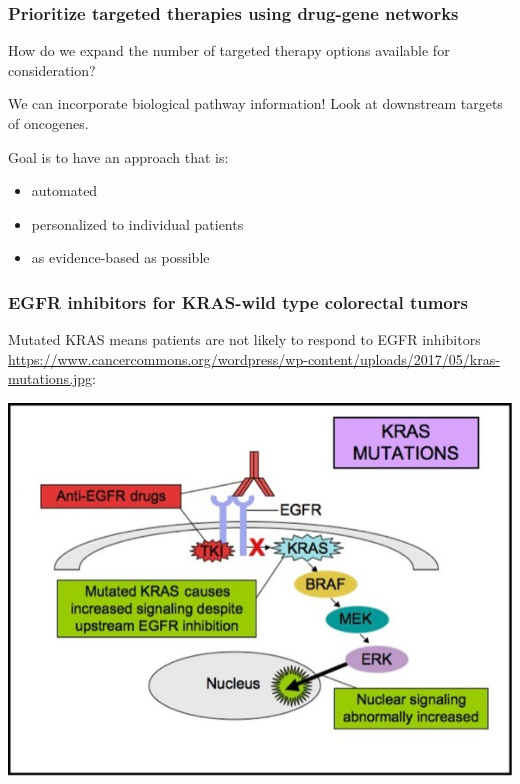 \documentclass{beamer}
\begin{document}

\begin{frame}
\frametitle{Prioritize targeted therapies using drug-gene networks}

How do we expand the number of targeted therapy options available for consideration? 

\vspace{0.5cm}

We can incorporate biological pathway information! {\color{red}Look at downstream targets of oncogenes}.

\vspace{0.5cm}

Goal is to have an approach that is:

\begin{itemize}
\item automated
\item personalized to individual patients
\item as evidence-based as possible
\end{itemize}

\end{frame}


\begin{frame}
\frametitle{EGFR inhibitors for KRAS-wild type colorectal tumors}

Mutated KRAS means patients are not likely to respond to EGFR inhibitors \url{https://www.cancercommons.org/wordpress/wp-content/uploads/2017/05/kras-mutations.jpg}:

\includegraphics[height=0.72\textheight, center]{mutated_KRAS_path.jpg}

\end{frame}
\end{document}
